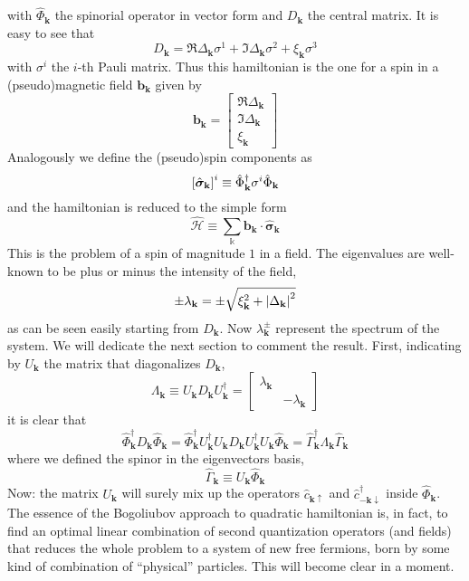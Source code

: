 with $\hat{\Phi}_\mathbf{k}$ the spinorial operator in vector form and $D_\mathbf{k}$ the central matrix. It is easy to see that
\[
	D_\mathbf{k} = \Re{\Delta_\mathbf{k}} \sigma^1 + \Im{\Delta_\mathbf{k}} \sigma^2 + \xi_\mathbf{k} \sigma^3
\]
with $\sigma^i$ the $i$-th Pauli matrix. Thus this hamiltonian is the one for a spin in a (pseudo)magnetic field $\mathbf{b}_\mathbf{k}$ given by
\[
	\mathbf{b}_\mathbf{k} = \begin{bmatrix}
		\Re{\Delta_\mathbf{k}} \\ \Im{\Delta_\mathbf{k}} \\ \xi_\mathbf{k}
	\end{bmatrix}
\]
Analogously we define the (pseudo)spin components as
\[
	\left[{\hat{\bm{\sigma}}_\mathbf{k}}\right]^i \equiv \hat{\Phi}_\mathbf{k}^\dagger \sigma^i \hat{\Phi}_\mathbf{k}
\]
and the hamiltonian is reduced to the simple form
\[
	\hat{\mathcal{H}} \equiv \sum_\mathbb{k} \mathbf{b}_\mathbf{k} \cdot \hat{\bm{\sigma}}_\mathbf{k}
\]
This is the problem of a spin of magnitude $1$ in a field.
The eigenvalues are well-known to be plus or minus the intensity of the field,
\[
	\pm \lambda_\mathbf{k} = \pm \sqrt{\xi_\mathbf{k}^2 + \abs{\Delta_\mathbf{k}}^2}
\]
as can be seen easily starting from $D_\mathbf{k}$.
Now $\lambda_\mathbf{k}^\pm$ represent the spectrum of the system. We will dedicate the next section to comment the result. First, indicating by $U_\mathbf{k}$ the matrix that diagonalizes $D_\mathbf{k}$,
\[
	\Lambda_\mathbf{k} \equiv
	U_\mathbf{k} D_\mathbf{k} U_\mathbf{k}^\dagger = \begin{bmatrix}
		\lambda_\mathbf{k} & \\
		& -\lambda_\mathbf{k}
	\end{bmatrix}
\]
it is clear that
\[
	\hat{\Phi}_\mathbf{k}^\dagger D_\mathbf{k} \hat{\Phi}_\mathbf{k} = \hat{\Phi}_\mathbf{k}^\dagger U_\mathbf{k}^\dagger U_\mathbf{k} D_\mathbf{k} U_\mathbf{k}^\dagger U_\mathbf{k} \hat{\Phi}_\mathbf{k} = \hat{\Gamma}_\mathbf{k}^\dagger \Lambda_\mathbf{k} \hat{\Gamma}_\mathbf{k}
\]
where we defined the spinor in the eigenvectors basis,
\[
	\hat{\Gamma}_\mathbf{k} \equiv U_\mathbf{k} \hat{\Phi}_\mathbf{k}
\]
Now: the matrix $U_\mathbf{k}$ will surely mix up the operators $\hat{c}_{\mathbf{k}\uparrow}$ and $\hat{c}_{-\mathbf{k}\downarrow}^\dagger$ inside $\hat{\Phi}_\mathbf{k}$. The essence of the Bogoliubov approach to quadratic hamiltonian is, in fact, to find an optimal linear combination of second quantization operators (and fields) that reduces the whole problem to a system of new free fermions, born by some kind of combination of ``physical'' particles. This will become clear in a moment.

